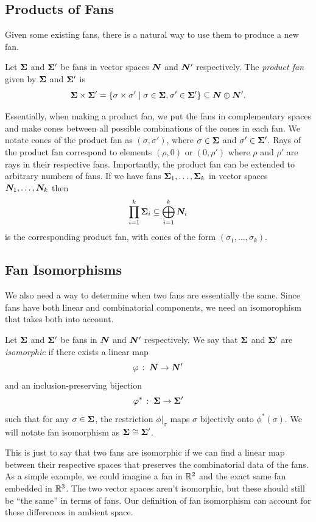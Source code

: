 \documentclass[12pt,oneside]{../../sfsuthesis}
\begin{document}
\subsection{Products of Fans}

Given some existing fans, there is a natural way to use them to produce a new fan.
\begin{definition}\th\label{def:productFan}
    Let \( {\bm{\Sigma}} \) and \( {\bm{\Sigma}}' \) be fans in vector spaces \( \bm{N} \) and \( \bm{N}' \) respectively.
    The \emph{product fan} given by \( {\bm{\Sigma}} \) and \( {\bm{\Sigma}}' \) is
    \[
        {\bm{\Sigma}} \times {\bm{\Sigma}}' = \{ \sigma \times \sigma' \; | \; \sigma \in {\bm{\Sigma}}, \sigma' \in {\bm{\Sigma}}' \} \subseteq \bm{N} \oplus \bm{N}'.
    \]
\end{definition}
Essentially, when making a product fan, we put the fans in complementary spaces and make cones between all possible combinations of the cones in each fan.
We notate cones of the product fan as \( (\sigma, \sigma') \), where \( \sigma \in {\bm{\Sigma}} \) and \(\sigma' \in {\bm{\Sigma}}' \).
Rays of the product fan correspond to elements \( (\rho, 0) \) or \( (0, \rho') \) where \( \rho \) and \( \rho' \) are rays in their respective fans.
Importantly, the product fan can be extended to arbitrary numbers of fans.
If we have fans \( {\bm{\Sigma}}_1, \dots, {\bm{\Sigma}}_k \) in vector spaces \( \bm{N}_1, \dots, \bm{N}_k \) then
\[
    \prod_{i=1}^k {\bm{\Sigma}}_i \subseteq \bigoplus_{i=1}^k \bm{N}_i
\]
is the corresponding product fan, with cones of the form \( (\sigma_1, \dots, \sigma_k) \).

\subsection{Fan Isomorphisms}

We also need a way to determine when two fans are essentially the same.
Since fans have both linear and combinatorial components, we need an isomorophism that takes both into account.

\begin{definition}\th\label{def:fanIsomorphism}
    Let \( {\bm{\Sigma}} \) and \( {\bm{\Sigma}}' \) be fans in \( \bm{N} \) and \( \bm{N}' \) respectively.
    We say that \( {\bm{\Sigma}} \) and \( {\bm{\Sigma}}' \) are \emph{isomorphic} if there exists a linear map
    \[
        \varphi\,:\; \bm{N} \to \bm{N}'
    \]
    and an inclusion-preserving bijection
    \[
        \varphi^\ast \,:\; {\bm{\Sigma}} \to {\bm{\Sigma}}'
    \]
    such that for any \( \sigma \in {\bm{\Sigma}} \), the restriction \( \phi|_\sigma \) maps \( \sigma \) bijectivly onto \( \phi^\ast(\sigma) \).
    We will notate fan isomorphism as \( {\bm{\Sigma}} \cong {\bm{\Sigma}}' \).
\end{definition}
This is just to say that two fans are isomorphic if we can find a linear map between their respective spaces that preserves the combinatorial data of the fans.
As a simple example, we could imagine a fan in \( \mathbb{R}^2 \) and the exact same fan embedded in \( \mathbb{R}^3 \).
The two vector spaces aren't isomorphic, but these should still be ``the same'' in terms of fans.
Our definition of fan isomorphism can account for these differences in ambient space.
\end{document}
